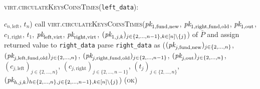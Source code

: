\begin{center}
\begin{processbox}{\textsc{virt}.\textsc{circulateKeysCoinsTimes}(\texttt{left\_data}):}
\begin{algorithmic}[1]
          $c_{n, \mathrm{left}}$, $t_n$)
        \EndIf
      \Else \: 
        \State call \textsc{virt.circulateKeysCoinsTimes}($\textit{pk}_{1, \mathrm{fund},
        \mathrm{new}}$, $\textit{pk}_{1, \mathrm{right}, \mathrm{fund}, \mathrm{old}}$,
        $\textit{pk}_{1, \mathrm{out}}$, $c_{1, \mathrm{right}}$, $t_1$,
        $\textit{pk}_{\mathrm{left}, \mathrm{virt}}$, $\textit{pk}_{\mathrm{right},
        \mathrm{virt}}$, $(\textit{pk}_{1, j, k})_{j \in \{2, \dots, n-1\}, k \in [n]
        \setminus \{j\}}$) of $\bar{P}$ and assign returned value to
        \texttt{right\_data}
        \State parse \texttt{right\_data} as ($(\textit{pk}_{j, \mathrm{fund},
        \mathrm{new}})_{j \in \{2, \dots, n\}}$, $(\textit{pk}_{j, \mathrm{left},
        \mathrm{fund}, \mathrm{old}})_{j \in \{2, \dots, n\}}$, $(\textit{pk}_{j,
        \mathrm{right}, \mathrm{fund}, \mathrm{old}})_{j \in \{2, \dots,
        n-1\}}$, $(\textit{pk}_{j, \mathrm{out}})_{j \in \{2, \dots, n\}}$, $(c_{j,
        \mathrm{left}})_{j \in \{2, \dots, n\}}$, $(c_{j, \mathrm{right}})_{j
        \in \{2, \dots, n-1\}}$, $(t_j)_{j \in \{2, \dots, n\}}$, $(\textit{pk}_{h, j,
        k})_{h \in \{2, \dots, n\}, j \in \{2, \dots, n-1\}, k \in [n] \setminus
        \{j\}}$)
        \State \Return (\textsc{ok})
      \EndIf
    \end{algorithmic}
  \end{processbox}
  \label{code:virtual-layer:circulate-keys-and-coins}
\end{center}


